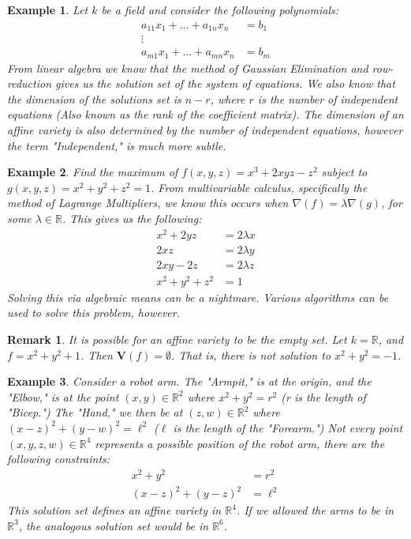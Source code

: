 \documentclass[oneside]{book}
\theoremstyle{mystyle}
\newtheorem{example}{Example}[section]
\newtheorem{remark}{Remark}[section]
\begin{document}
\begin{example}
Let $k$ be a field and consider the following polynomials:
\begin{align*}
\nonumber a_{11}x_1+\hdots + a_{1n}x_n &= b_1 \\ \nonumber \vdots&  \\ \nonumber a_{m1}x_1+\hdots + a_{mn}x_n &= b_m
\end{align*}
From linear algebra we know that the method of Gaussian Elimination and row-reduction gives us the solution set of the system of equations. We also know that the dimension of the solutions set is $n-r$, where $r$ is the number of independent equations (Also known as the rank of the coefficient matrix). The dimension of an affine variety is also determined by the number of independent equations, however the term "Independent," is much more subtle.
\end{example}
\begin{example}
Find the maximum of $f(x,y,z) = x^3+2xyz-z^2$ subject to $g(x,y,z) = x^2+y^2+z^2=1$. From multivariable calculus, specifically the method of Lagrange Multipliers, we know this occurs when $\nabla(f) = \lambda \nabla(g)$, for some $\lambda \in \mathbb{R}$. This gives us the following:
\begin{align*}
    x^2+2yz &= 2\lambda x\\
    2xz &= 2\lambda y \\
    2xy-2z &= 2\lambda z\\
    x^2+y^2+z^2 &= 1
\end{align*}
Solving this via algebraic means can be a nightmare. Various algorithms can be used to solve this problem, however.
\end{example}
\begin{remark}
It is possible for an affine variety to be the empty set. Let $k = \mathbb{R}$, and $f = x^2+y^2+1$. Then $\mathbf{V}(f) = \emptyset$. That is, there is not solution to $x^2+y^2 = -1$.
\end{remark}
\begin{example}
Consider a robot arm. The "Armpit," is at the origin, and the "Elbow," is at the point $(x,y)\in \mathbb{R}^2$ where $x^2+y^2 = r^2$ (r is the length of "Bicep.") The "Hand," we then be at $(z,w)\in \mathbb{R}^2$ where $(x-z)^2 + (y-w)^2 = \ell^2$ ($\ell$ is the length of the "Forearm.") Not every point $(x,y,z,w)\in \mathbb{R}^4$ represents a possible position of the robot arm, there are the following constraints:
\begin{align*}
    x^2+y^2 &= r^2 \\ 
    (x-z)^2+(y-z)^2 &= \ell^2
\end{align*}
This solution set defines an affine variety in $\mathbb{R}^4$. If we allowed the arms to be in $\mathbb{R}^3$, the analogous solution set would be in $\mathbb{R}^6$.
\end{example}
\end{document}
